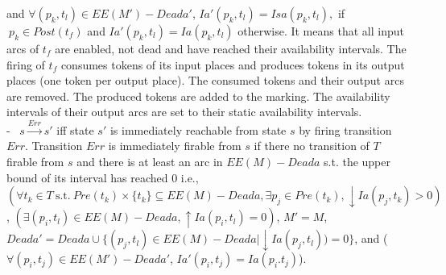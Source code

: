 \documentclass[submission,copyright,creativecommons]{eptcs}
\numberwithin{equation}{section}
\begin{document}
 and \(\forall (p_k,t_l) \in EE(M')-Deada'\), $Ia'(p_k,t_l) = Isa(p_k,t_l),$  if $ ~ p_k \in Post(t_f)$ and $Ia'(p_k,t_l) =Ia(p_k,t_l)$
 otherwise. It means that all input arcs of $t_f$ are enabled, not dead and  have reached their availability intervals. The firing of $t_f$ consumes tokens of its input places and produces tokens in its output places (one token per output place). The consumed tokens and their output arcs are removed. The produced tokens are added to the marking. The availability intervals of their output arcs are set to their static availability intervals.\\
- \ \(s \overset{Err}\rightarrow s'\) iff  state \(s'\) is immediately
reachable from state \(s\) by firing transition \(Err\). Transition $Err$ is immediately firable from $s$ if there no transition of $T$ firable from $s$ and there is at least an arc in $EE(M)-Deada$ s.t. the upper bound of its interval has reached $0$ i.e., \((\forall t_k \in T \ \text{s.t.} \ Pre(t_k) \times \{t_k\} \subseteq EE(M)-Deada, \exists p_j \in Pre(t_k),   {\downarrow Ia(p_j,t_k)}>0 ) \), \((\exists (p_i,t_l) \in EE(M)-Deada, {\uparrow Ia(p_i,t_l)} = 0)\),
 \(M' = M\), $Deada'=Deada \cup \{ (p_j,t_l) \in EE(M)-Deada | {\downarrow Ia(p_j,t_l)})=0 \}$,  and (\(\forall (p_i,t_j) \in EE(M') - Deada'\), $Ia'(p_i,t_j) = Ia(p_i.t_j)$).
\end{document}

